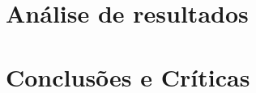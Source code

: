 \documentclass[%
  reprint,
  nofootinbib,
  amsmath,amssymb,
  aps,
  10pt,
  a4paper
]{revtex4-1}
\begin{document}
\section{Análise de resultados}
\label{s:aresul}





\section{Conclusões e Críticas}
\label{s:conclu}







\nocite{*}
{}
\end{document}
